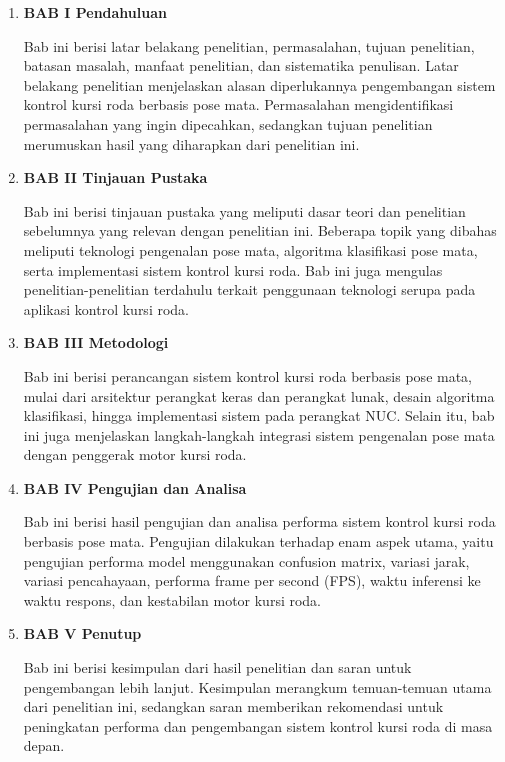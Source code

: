 \begin{enumerate}[nolistsep]

  \item \textbf{BAB I Pendahuluan}

        Bab ini berisi latar belakang penelitian, permasalahan, tujuan penelitian, batasan masalah, manfaat penelitian, dan sistematika penulisan. Latar belakang penelitian menjelaskan alasan diperlukannya pengembangan sistem kontrol kursi roda berbasis pose mata. Permasalahan mengidentifikasi permasalahan yang ingin dipecahkan, sedangkan tujuan penelitian merumuskan hasil yang diharapkan dari penelitian ini.

        \vspace{2ex}

  \item \textbf{BAB II Tinjauan Pustaka}

        Bab ini berisi tinjauan pustaka yang meliputi dasar teori dan penelitian sebelumnya yang relevan dengan penelitian ini. Beberapa topik yang dibahas meliputi teknologi pengenalan pose mata, algoritma klasifikasi pose mata, serta implementasi sistem kontrol kursi roda. Bab ini juga mengulas penelitian-penelitian terdahulu terkait penggunaan teknologi serupa pada aplikasi kontrol kursi roda.

        \vspace{2ex}

  \item \textbf{BAB III Metodologi}

        Bab ini berisi perancangan sistem kontrol kursi roda berbasis pose mata, mulai dari arsitektur perangkat keras dan perangkat lunak, desain algoritma klasifikasi, hingga implementasi sistem pada perangkat NUC. Selain itu, bab ini juga menjelaskan langkah-langkah integrasi sistem pengenalan pose mata dengan penggerak motor kursi roda.

        \vspace{2ex}

  \item \textbf{BAB IV Pengujian dan Analisa}

        Bab ini berisi hasil pengujian dan analisa performa sistem kontrol kursi roda berbasis pose mata. Pengujian dilakukan terhadap enam aspek utama, yaitu pengujian performa model menggunakan confusion matrix, variasi jarak, variasi pencahayaan, performa frame per second (FPS), waktu inferensi ke waktu respons, dan kestabilan motor kursi roda.

        \vspace{2ex}

  \item \textbf{BAB V Penutup}

        Bab ini berisi kesimpulan dari hasil penelitian dan saran untuk pengembangan lebih lanjut. Kesimpulan merangkum temuan-temuan utama dari penelitian ini, sedangkan saran memberikan rekomendasi untuk peningkatan performa dan pengembangan sistem kontrol kursi roda di masa depan.

\end{enumerate}